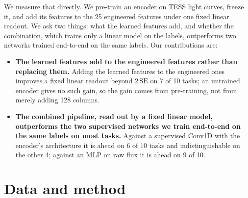 \documentclass{article}
\begin{document}
We measure that directly. We pre-train an encoder on TESS light curves, freeze it, and add its
features to the 25 engineered features under one fixed linear readout. We ask two things: what the
learned features add, and whether the combination, which trains only a linear model on the labels,
outperforms two networks trained end-to-end on the same labels. Our contributions are:

\begin{itemize}
\item \textbf{The learned features add to the engineered features rather than replacing them.}
Adding the learned features to the engineered ones improves a fixed linear readout beyond
$2\,\mathrm{SE}$ on 7 of 10 tasks; an untrained encoder gives no such gain, so the gain comes from pre-training,
not from merely adding 128 columns.
\item \textbf{The combined pipeline, read out by a fixed linear model, outperforms the two
supervised networks we train end-to-end on the same labels on most tasks.} Against a supervised Conv1D with the
encoder's architecture it is ahead on 6
of 10 tasks and indistinguishable on the other 4; against an MLP on raw flux it is ahead on 9 of 10.
\end{itemize}

\section{Data and method}
\end{document}
